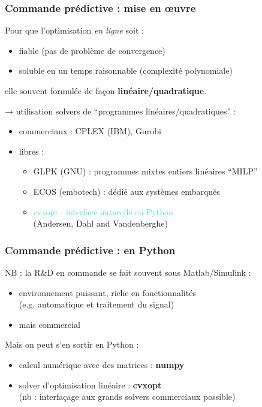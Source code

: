 \begin{frame}
  \frametitle{Commande prédictive : mise en œuvre}
  
  Pour que l'optimisation \emph{en ligne} soit :
  \begin{itemize}
   \item fiable (pas de problème de convergence)
   \item soluble en un temps raisonnable (complexité polynomiale)
  \end{itemize}
  elle souvent formulée de façon \textbf{linéaire/quadratique}.
  
  
  \bigskip \pause
  → utilisation solvers de ``programmes linéaires/quadratiques'' :
  
  \begin{itemize}
   \item commerciaux : CPLEX (IBM), Gurobi
   \item libres : 
   \begin{itemize}
    \item GLPK (GNU) : programmes mixtes entiers linéaires ``MILP''
    \item ECOS (embotech) : dédié aux systèmes embarqués
    \item \textcolor{turquoise}{cvxopt : interface naturelle en Python} \\ { \footnotesize (Andersen, Dahl and Vandenberghe)}
   \end{itemize}
  \end{itemize}
\end{frame}

\begin{frame}
  \frametitle{Commande prédictive : en Python}
  
  NB : la R\&D en commande se fait souvent sous Matlab/Simulink :
  \begin{itemize}
   \item environnement puissant, riche en fonctionnalités \\(e.g. automatique et traitement du signal)
   \item mais commercial 
  \end{itemize}

  \bigskip \pause
  
  Mais on peut s'en sortir en Python :
  
  \begin{itemize}
   \item calcul numérique avec des matrices : \textbf{numpy}
   \item solver d'optimisation linéaire : \textbf{cvxopt}\\
   (nb : interfaçage aux grands solvers commerciaux possible)
  \end{itemize}

\end{frame}


